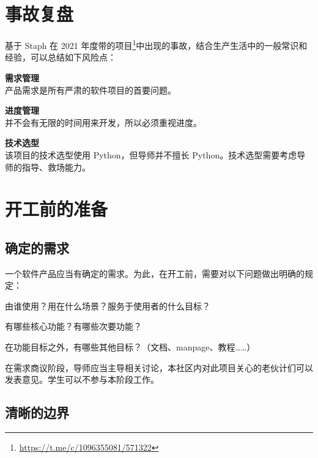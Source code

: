 \documentclass[a4paper,11pt]{article}
\newcommand{\smallnote}[1]{{\sffamily\footnotesize#1}}
\begin{document}
\section{事故复盘}

基于 Staph 在 2021 年度带的项目\footnote{\href{https://t.me/c/1096355081/571322}{https://t.me/c/1096355081/571322}}中出现的事故，结合生产生活中的一般常识和经验，可以总结如下风险点：

\begin{compactitem}
	\item \textbf{需求管理}\\产品需求是所有严肃的软件项目的首要问题。
	\item \textbf{进度管理}\\并不会有无限的时间用来开发，所以必须重视进度。
	\item \textbf{技术选型}\\该项目的技术选型使用 Python，但导师并不擅长 Python。技术选型需要考虑导师的指导、救场能力。
\end{compactitem}









\section{开工前的准备}

\subsection{确定的需求}

一个软件产品应当有确定的需求。为此，在开工前，需要对以下问题做出明确的规定：

\begin{compactitem}
	\item 由谁使用？用在什么场景？服务于使用者的什么目标？
	\item 有哪些核心功能？有哪些次要功能？
	\item 在功能目标之外，有哪些其他目标？\smallnote{（文档、manpage、教程……）}
\end{compactitem}

在需求商议阶段，导师应当主导相关讨论，本社区内对此项目关心的老伙计们可以发表意见。学生可以不参与本阶段工作。

\subsection{清晰的边界}
\end{document}
